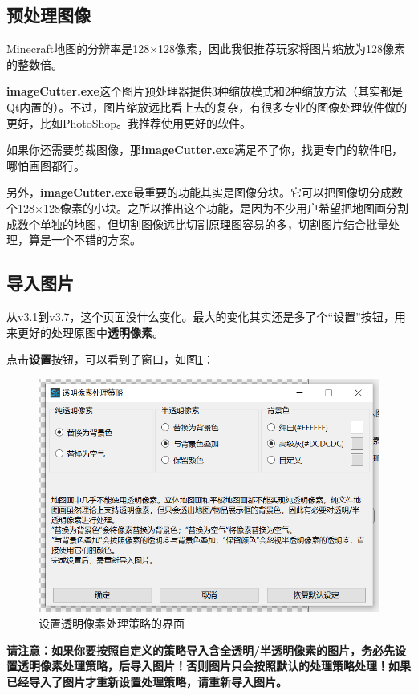 \documentclass[UTF8]{ctexart}
\begin{document}
\subsection{预处理图像}
Minecraft地图的分辨率是128×128像素，因此我很推荐玩家将图片缩放为128像素的整数倍。

\textbf{imageCutter.exe}这个图片预处理器提供3种缩放模式和2种缩放方法（其实都是Qt内置的）。不过，图片缩放远比看上去的复杂，有很多专业的图像处理软件做的更好，比如PhotoShop。我推荐使用更好的软件。

如果你还需要剪裁图像，那\textbf{imageCutter.exe}满足不了你，找更专门的软件吧，哪怕画图都行。

另外，\textbf{imageCutter.exe}最重要的功能其实是图像分块。它可以把图像切分成数个128×128像素的小块。之所以推出这个功能，是因为不少用户希望把地图画分割成数个单独的地图，但切割图像远比切割原理图容易的多，切割图片结合批量处理，算是一个不错的方案。

\subsection{导入图片}
从v3.1到v3.7，这个页面没什么变化。最大的变化其实还是多了个“设置”按钮，用来更好的处理原图中\textbf{透明像素}。

点击\textbf{设置}按钮，可以看到子窗口，如图\ref*{SetTPS}：

\begin{figure}[htbp]
    \centering
    \includegraphics[width=15cm]{Img1_TPS.png}
    \caption{设置透明像素处理策略的界面}
    \label{SetTPS}
\end{figure}

\textbf{请注意：如果你要按照自定义的策略导入含全透明/半透明像素的图片，务必先设置透明像素处理策略，后导入图片！否则图片只会按照默认的处理策略处理！如果已经导入了图片才重新设置处理策略，请重新导入图片。}
\end{document}
